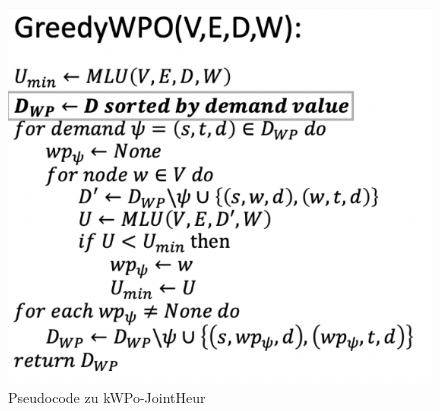 \documentclass[sigconf,noacm,review]{acmart}
\begin{document}
\begin{figure}[h]
  \centering
  \includegraphics[width=\linewidth]{abbildungen/pseudo1}
  \caption{Pseudocode zu kWPo-JointHeur}
\end{figure}
\end{document}
